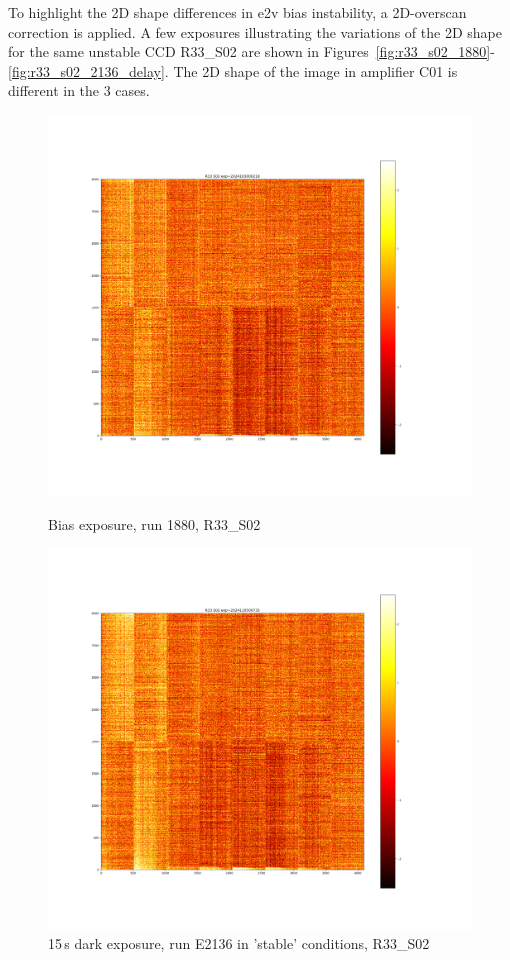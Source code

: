 To highlight the 2D shape differences in e2v bias instability, a 2D-overscan correction
is applied. A few exposures illustrating the variations of the 2D shape
for the same unstable CCD R33\_S02 are shown in Figures~\ref{fig:r33_s02_1880}-\ref{fig:r33_s02_2136_delay}. The 2D shape of the image in
amplifier C01 is different in the 3 cases.

\begin{figure}[htbp]
\centering
\begin{minipage}{0.45\textwidth}
    \centering
    \includegraphics[width=\textwidth]{figures/E1880_bias_R33_S02.png}
    \caption{Bias exposure, run 1880, R33\_S02}
    \label{fig:r33_s02_1880}
\end{minipage}
\hfill
\begin{minipage}{0.45\textwidth}
    \centering
    \includegraphics[width=\textwidth]{figures/E2136_dark15_R33_S02.png}
    \caption{15\,s dark exposure, run E2136 in 'stable' conditions, R33\_S02}
    \label{fig:r33_s02_2136}
\end{minipage}


\end{figure}
